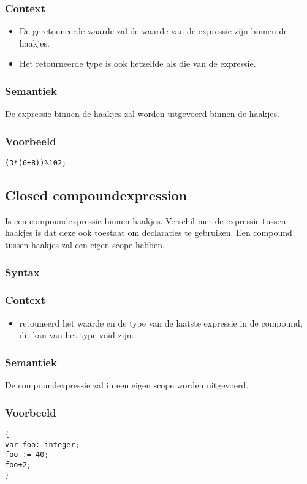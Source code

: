 \documentclass[]{article}
\begin{document}
\subsubsection{Context}
\begin{itemize}
\item De geretouneerde waarde zal de waarde van de expressie zijn binnen de haakjes.
\item Het retourneerde type is ook hetzelfde als die van de expressie.
\end{itemize}
\subsubsection{Semantiek}
De expressie binnen de haakjes zal worden uitgevoerd binnen de haakjes.
\subsubsection{Voorbeeld}
\begin{lstlisting}[style=SELMA]
(3*(6+8))%102;
\end{lstlisting}

\subsection{Closed compoundexpression}
Is een compoundexpressie binnen haakjes. Verschil met de expressie tussen haakjes is dat deze ook toestaat om declaraties te gebruiken. Een compound tussen haakjes zal een eigen scope hebben.
\subsubsection{Syntax}

\subsubsection{Context}
\begin{itemize}
\item retouneerd het waarde en de type van de laatste expressie in de compound, dit kan van het type void zijn.
\end{itemize}
\subsubsection{Semantiek}
De compoundexpressie zal in een eigen scope worden uitgevoerd.
\subsubsection{Voorbeeld}
\begin{lstlisting}[style=SELMA]
{
var foo: integer;
foo := 40;
foo+2;
}
\end{lstlisting}
\end{document}

